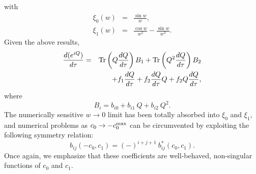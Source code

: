 with
\begin{eqnarray}
 \xi_0(w) &=& \frac{\sin w}{w},\\
 \xi_1(w) &=& \frac{\cos w}{w^2}-\frac{\sin w}{w^3}.
\end{eqnarray}
Given the above results,
\begin{eqnarray}
\frac{d(e^{i Q})}{d\tau}&=&\mbox{Tr}\left(Q\frac{dQ}{d\tau}\right) B_1
+\mbox{Tr}\left(Q^2\frac{dQ}{d\tau}\right) B_2\nonumber\\
&&+ f_1\frac{dQ}{d\tau}+f_2\frac{dQ}{d\tau}Q+f_2Q\frac{dQ}{d\tau},
\label{eq:dRdef}
\end{eqnarray}
where
\begin{equation}
 B_i = b_{i0}+b_{i1}\ Q + b_{i2}\ Q^2.
\end{equation}
The numerically sensitive $w\rightarrow 0$ limit has been
totally absorbed into $\xi_0$ and $\xi_1$, and
numerical problems as $c_0\rightarrow -c_0^{\rm max}$ can 
be circumvented by exploiting the following symmetry relation:
\begin{equation}
  b_{ij}(-c_0,c_1)=
  (-)^{i+j+1}\ b_{ij}^\ast(c_0,c_1). \label{eq:bsym}
\end{equation}
Once again, we emphasize that these coefficients are well-behaved,
non-singular functions of $c_0$ and $c_1$.

